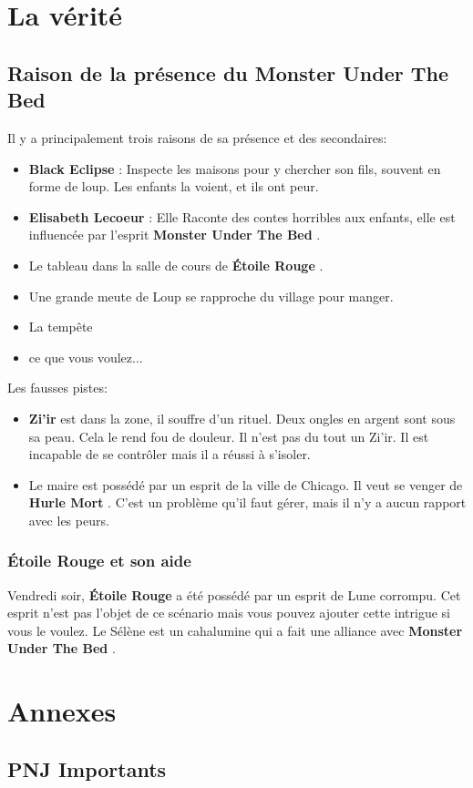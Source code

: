 \documentclass[oneside,12pt]{book}
\newcommand{\Lynn}{\textbf{Étoile Rouge} }
\newcommand{\Peter}{\textbf{Hurle Mort} }
\newcommand{\Monster}{\textbf{Monster Under The Bed} }
\newcommand{\BlackEclipse}{\textbf{Black Eclipse} }
\newcommand{\Elisabeth}{\textbf{Elisabeth Lecoeur} }
\newcommand{\Thomas}{\textbf{Zi'ir} }
\begin{document}
\begin{flushleft}
\chapter{La vérité}

\section{Raison de la présence du \Monster}
Il y a principalement trois raisons de sa présence et des secondaires: 
\begin{itemize}
\item \BlackEclipse : Inspecte les maisons pour y chercher son fils, souvent en forme de loup. Les enfants la voient, et ils ont peur.
\item \Elisabeth : Elle Raconte des contes horribles aux enfants, elle est influencée par l'esprit \Monster.
\item Le tableau dans la salle de cours de \Lynn. 
\item Une grande meute de Loup se rapproche du village pour manger.
\item La tempête
\item ce que vous voulez...
\end{itemize}

Les fausses pistes:
\begin{itemize}
\item \Thomas est dans la zone, il souffre d'un rituel. Deux ongles en argent sont sous sa peau. 
Cela le rend fou de douleur. Il n'est pas du tout un Zi'ir. Il est incapable de se contrôler mais il a réussi à 
s'isoler. 
\item Le maire est possédé par un esprit de la ville de Chicago. Il veut se venger de \Peter. C'est un problème qu'il faut gérer, mais il n'y a aucun rapport avec les peurs.
\end{itemize}


\subsection{\Lynn et son aide}
Vendredi soir, \Lynn a été possédé par un esprit de Lune corrompu. 
Cet esprit n'est pas l'objet de ce scénario mais vous pouvez ajouter cette intrigue si vous le voulez. 
Le Sélène est un cahalumine qui a fait une alliance avec \Monster .


\chapter{Annexes}
\section{PNJ Importants}

\end{flushleft}
\end{document}
